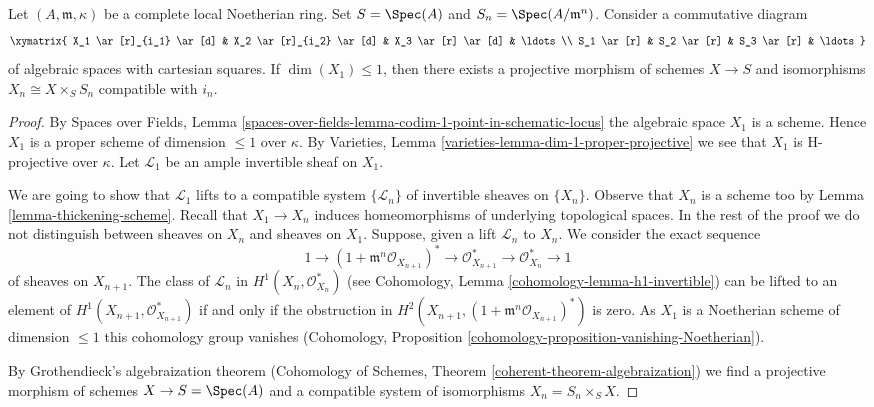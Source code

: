 \begin{lemma}
\label{lemma-formal-algebraic-space-proper-reldim-1}
Let $(A, \mathfrak m, \kappa)$ be a complete local Noetherian ring.
Set $S = \Spec(A)$ and $S_n = \Spec(A/\mathfrak m^n)$.
Consider a commutative diagram
$$
\xymatrix{
X_1 \ar[r]_{i_1} \ar[d] & X_2 \ar[r]_{i_2} \ar[d] & X_3 \ar[r] \ar[d] &
\ldots \\
S_1 \ar[r] & S_2 \ar[r] & S_3 \ar[r] & \ldots
}
$$
of algebraic spaces with cartesian squares. If $\dim(X_1) \leq 1$,
then there exists a projective morphism of schemes $X \to S$
and isomorphisms $X_n \cong X \times_S S_n$ compatible with $i_n$.
\end{lemma}

\begin{proof}
By Spaces over Fields, Lemma
\ref{spaces-over-fields-lemma-codim-1-point-in-schematic-locus}
the algebraic space $X_1$ is a scheme. Hence $X_1$
is a proper scheme of dimension $\leq 1$ over $\kappa$.
By Varieties, Lemma \ref{varieties-lemma-dim-1-proper-projective}
we see that $X_1$ is H-projective over $\kappa$.
Let $\mathcal{L}_1$ be an ample invertible sheaf on $X_1$.

\medskip\noindent
We are going to show that $\mathcal{L}_1$ lifts to a compatible system
$\{\mathcal{L}_n\}$ of invertible sheaves on $\{X_n\}$.
Observe that $X_n$ is a scheme too by Lemma \ref{lemma-thickening-scheme}.
Recall that $X_1 \to X_n$ induces homeomorphisms of underlying
topological spaces. In the rest of the proof we do not distinguish
between sheaves on $X_n$ and sheaves on $X_1$.
Suppose, given a lift $\mathcal{L}_n$ to $X_n$. We consider
the exact sequence
$$
1 \to
(1 + \mathfrak m^n\mathcal{O}_{X_{n + 1}})^* \to
\mathcal{O}_{X_{n + 1}}^* \to \mathcal{O}_{X_n}^* \to 1
$$
of sheaves on $X_{n + 1}$. The class of $\mathcal{L}_n$ in
$H^1(X_n, \mathcal{O}_{X_n}^*)$ (see
Cohomology, Lemma \ref{cohomology-lemma-h1-invertible})
can be lifted to an element of $H^1(X_{n + 1}, \mathcal{O}_{X_{n + 1}}^*)$
if and only if the obstruction in
$H^2(X_{n + 1}, (1 + \mathfrak m^n\mathcal{O}_{X_{n + 1}})^*)$
is zero. As $X_1$ is a Noetherian scheme of dimension $\leq 1$
this cohomology group vanishes (Cohomology, Proposition
\ref{cohomology-proposition-vanishing-Noetherian}).

\medskip\noindent
By Grothendieck's algebraization theorem
(Cohomology of Schemes, Theorem \ref{coherent-theorem-algebraization})
we find a projective morphism of schemes $X \to S = \Spec(A)$
and a compatible system of isomorphisms $X_n = S_n \times_S X$.
\end{proof}

